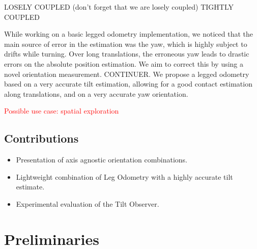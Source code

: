 \documentclass{IJCAS}
\begin{document}
    LOSELY COUPLED (don't forget that we are losely coupled)
    TIGHTLY COUPLED

    While working on a basic legged odometry implementation, we noticed that the main source of error in the estimation was the yaw, which is highly subject to drifts while turning. Over long translations, the erroneous yaw leads to drastic errors on the absolute position estimation. We aim to correct this by using a novel orientation measurement. CONTINUER.
    We propose a legged odometry based on a very accurate tilt estimation, allowing for a good contact estimation along translations, and on a very accurate yaw orientation.

    \textcolor{red}{Possible use case: spatial exploration}




\subsection{Contributions}
\begin{itemize}
  \item Presentation of axis agnostic orientation combinations.
  \item Lightweight combination of Leg Odometry with a highly accurate tilt estimate.
  \item Experimental evaluation of the Tilt Observer.
\end{itemize}

\section{Preliminaries}
\end{document}
